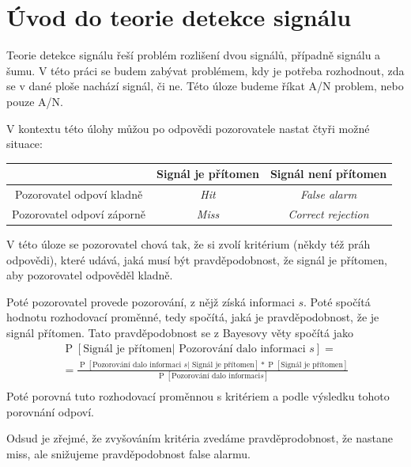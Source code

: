 \section{Úvod do teorie detekce signálu}

Teorie detekce signálu řeší problém rozlišení dvou signálů, případně signálu a
šumu. V této práci se budem zabývat problémem, kdy je potřeba rozhodnout, zda
se v dané ploše nachází signál, či ne. Této úloze budeme říkat A/N problem,
nebo pouze A/N.

V kontextu této úlohy můžou po odpovědi pozorovatele nastat čtyři možné situace:

\bigskip\noindent
\begin{center}
\begin{tabular}{ccc}
\hline
\hline
& Signál je přítomen & Signál není přítomen \\
\hline
Pozorovatel odpoví kladně &{\it Hit}&{\it False alarm} \\
Pozorovatel odpoví záporně &{\it Miss}&{\it Correct rejection}\\
\hline
\hline
\end{tabular}
\end{center}
\bigskip

 V této úloze se pozorovatel chová tak,
že si zvolí kritérium (někdy též práh odpovědi), které udává, jaká musí být
pravděpodobnost, že signál je přítomen, aby pozorovatel odpověděl kladně.

\def\P#1{\operatorname{P}\left[#1\right]}
\def\E#1{\mathbb{E}\left[#1\right]}
\def\tP#1{\P{\text{#1}}}

Poté pozorovatel provede pozorování, z nějž získá informaci $s$. Poté spočítá
hodnotu rozhodovací proměnné, tedy spočítá, jaká je pravděpodobnost, že je
signál přítomen. Tato pravděpodobnost se z Bayesovy věty spočítá jako 
\begin{multline*}
\tP{Signál je přítomen| Pozorování dalo informaci $s$} = \\ 
=\frac{\tP{Pozorování dalo informaci $s$
| Signál je přítomen}*\tP{Signál je přítomen}}{\tP{Pozorování dalo informaci
$s$}}\\ \end{multline*}
Poté porovná tuto rozhodovací proměnnou s kritériem a podle výsledku tohoto
porovnání odpoví.

Odsud je zřejmé, že zvyšováním kritéria zvedáme pravděprodobnost, že nastane
miss, ale snižujeme pravděpodobnost false alarmu.

